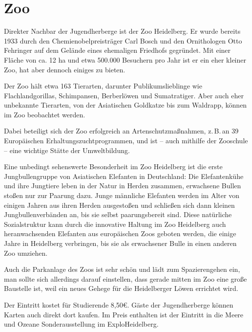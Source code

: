 
\section*{Zoo}
Direkter Nachbar der Jugendherberge ist der Zoo Heidelberg. Er wurde bereits 1933 durch den Chemienobelpreisträger Carl Bosch und den Ornithologen Otto Fehringer auf dem Gelände eines ehemaligen Friedhofs gegründet. Mit einer Fläche von ca. 12 ha und etwa 500.000 Besuchern pro Jahr ist er ein eher kleiner Zoo, hat aber dennoch einiges zu bieten.

Der Zoo hält etwa 163 Tierarten, darunter Publikumslieblinge wie Flachlandgorillas, Schimpansen, Berberlöwen und Sumatratiger. Aber auch eher unbekannte Tierarten, von der Asiatischen Goldkatze bis zum Waldrapp, können im Zoo beobachtet werden.

Dabei beteiligt sich der Zoo erfolgreich an Artenschutzmaßnahmen, z.\,B.\,an 39 Europäischen Erhaltungszuchtprogrammen, und ist -- auch mithilfe der Zooschule -- eine wichtige Stätte der Umweltbildung.

Eine unbedingt sehenswerte Besonderheit im Zoo Heidelberg ist die erste Jungbullengruppe von Asiatischen Elefanten in Deutschland: Die Elefantenkühe und ihre Jungtiere leben in der Natur in Herden zusammen, erwachsene Bullen stoßen nur zur Paarung dazu. Junge männliche Elefanten werden im Alter von einigen Jahren aus ihren Herden ausgestoßen und schließen sich dann kleinen Jungbullenverbänden an, bis sie selbst paarungsbereit sind. Diese natürliche Sozialstruktur kann durch die innovative Haltung im Zoo Heidelberg auch heranwachsenden Elefanten aus europäischen Zoos geboten werden, die einige Jahre in Heidelberg verbringen, bis sie als erwachsener Bulle in einen anderen Zoo umziehen. 

Auch die Parkanlage des Zoos ist sehr schön und lädt zum Spazierengehen ein, man sollte sich allerdings darauf einstellen, dass gerade mitten im Zoo eine große Baustelle ist, weil ein neues Gehege für die Heidelberger Löwen errichtet wird.

Der Eintritt kostet für Studierende 8,50€. Gäste der Jugendherberge können Karten auch direkt dort kaufen. Im Preis enthalten ist der Eintritt in die \glqq Meere und Ozeane\grqq{}  Sonderausstellung im ExploHeidelberg.